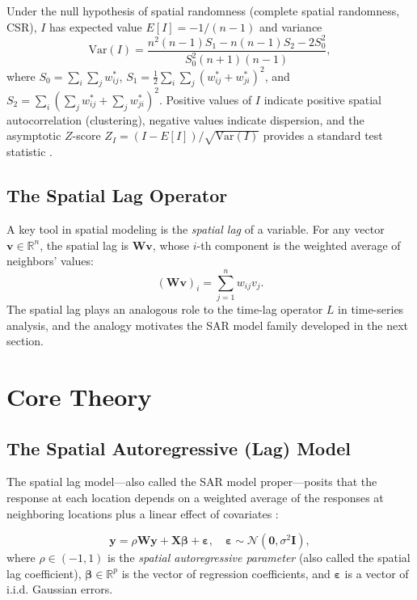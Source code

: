 \documentclass[conference]{IEEEtran}
\theoremstyle{definition}
\begin{document}
Under the null hypothesis of spatial randomness (complete spatial randomness, CSR), $I$ has expected value $E[I] = -1/(n-1)$ and variance
\begin{equation}
\mathrm{Var}(I) = \frac{n^2(n-1)S_1 - n(n-1)S_2 - 2S_0^2}{S_0^2(n+1)(n-1)},
\end{equation}
where $S_0 = \sum_{i}\sum_{j} w_{ij}^*$, $S_1 = \frac{1}{2}\sum_i\sum_j (w_{ij}^* + w_{ji}^*)^2$, and $S_2 = \sum_i (\sum_j w_{ij}^* + \sum_j w_{ji}^*)^2$. Positive values of $I$ indicate positive spatial autocorrelation (clustering), negative values indicate dispersion, and the asymptotic $Z$-score $Z_I = (I - E[I])/\sqrt{\mathrm{Var}(I)}$ provides a standard test statistic \cite{cliff1981spatial}.

\subsection{The Spatial Lag Operator}

A key tool in spatial modeling is the \emph{spatial lag} of a variable. For any vector $\mathbf{v} \in \mathbb{R}^n$, the spatial lag is $\mathbf{W}\mathbf{v}$, whose $i$-th component is the weighted average of neighbors' values:
\begin{equation}
(\mathbf{W}\mathbf{v})_i = \sum_{j=1}^{n} w_{ij} v_j.
\end{equation}
The spatial lag plays an analogous role to the time-lag operator $L$ in time-series analysis, and the analogy motivates the SAR model family developed in the next section.

\section{Core Theory}
\label{sec:theory}

\subsection{The Spatial Autoregressive (Lag) Model}

The spatial lag model---also called the SAR model proper---posits that the response at each location depends on a weighted average of the responses at neighboring locations plus a linear effect of covariates \cite{anselin1988spatial,lesage2009introduction}:

\begin{equation}
\label{eq:sar}
\mathbf{y} = \rho \mathbf{W} \mathbf{y} + \mathbf{X}\bm{\beta} + \bm{\varepsilon}, \quad \bm{\varepsilon} \sim \mathcal{N}(\mathbf{0}, \sigma^2 \mathbf{I}),
\end{equation}
where $\rho \in (-1, 1)$ is the \emph{spatial autoregressive parameter} (also called the spatial lag coefficient), $\bm{\beta} \in \mathbb{R}^p$ is the vector of regression coefficients, and $\bm{\varepsilon}$ is a vector of i.i.d. Gaussian errors.
\end{document}
